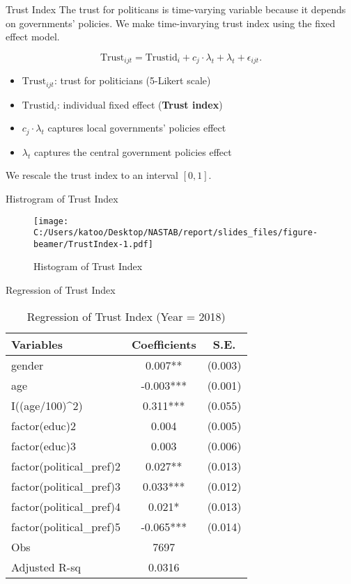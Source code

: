 \documentclass[
  ignorenonframetext,
]{beamer}
\providecommand{\tightlist}{%
  \setlength{\itemsep}{0pt}\setlength{\parskip}{0pt}}
\begin{document}
\begin{frame}{Trust Index}
\protect\hypertarget{trust-index}{}
The trust for politicans is time-varying variable because it depends on
governments' policies. We make time-invarying trust index using the
fixed effect model.

\[
    \text{Trust}_{ijt} = \text{Trustid}_i + c_j \cdot \lambda_t + \lambda_t + \epsilon_{ijt}.
\]

\begin{itemize}
\tightlist
\item
  \(\text{Trust}_{ijt}\): trust for politicians (5-Likert scale)
\item
  \(\text{Trustid}_i\): individual fixed effect (\textbf{Trust index})
\item
  \(c_j \cdot \lambda_t\) captures local governments' policies effect
\item
  \(\lambda_t\) captures the central government policies effect
\end{itemize}

We rescale the trust index to an interval \([0,1]\).
\end{frame}

\begin{frame}{Histrogram of Trust Index}
\protect\hypertarget{histrogram-of-trust-index}{}
\begin{figure}
\centering
\texttt{[image: C:/Users/katoo/Desktop/NASTAB/report/slides\_files/figure-beamer/TrustIndex-1.pdf]}
\caption{Histogram of Trust Index}
\end{figure}
\end{frame}

\begin{frame}{Regression of Trust Index}
\protect\hypertarget{regression-of-trust-index}{}
\begin{table}

\caption{\label{tab:kableTabTrustReg}Regression of Trust Index (Year = 2018)}
\centering
\begin{tabular}[t]{lcc}
\toprule
Variables & Coefficients & S.E.\\
\midrule
gender & 0.007** & (0.003)\\
age & -0.003*** & (0.001)\\
I((age/100)\textasciicircum{}2) & 0.311*** & (0.055)\\
factor(educ)2 & 0.004 & (0.005)\\
factor(educ)3 & 0.003 & (0.006)\\
factor(political\_pref)2 & 0.027** & (0.013)\\
factor(political\_pref)3 & 0.033*** & (0.012)\\
factor(political\_pref)4 & 0.021* & (0.013)\\
factor(political\_pref)5 & -0.065*** & (0.014)\\
Obs & 7697 & \\
Adjusted R-sq & 0.0316 & \\
\bottomrule
\end{tabular}
\end{table}
\end{frame}
\end{document}
